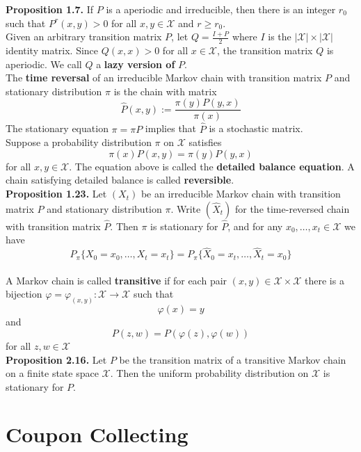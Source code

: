 \documentclass[12pt]{article}
\begin{document}
\textbf{Proposition 1.7.} If $P$ is a aperiodic and irreducible, then there is an integer $r_0$ such that $P^r(x,y) > 0$ for all $x, y \in \mathcal{X}$ and $r \geq r_0$.\\

Given an arbitrary transition matrix $P$, let $Q = \frac{I + P}{2}$ where $I$ is the $|\mathcal{X}| \times |\mathcal{X}|$ identity matrix. Since $Q(x, x) > 0$ for all $x \in \mathcal{X}$, the transition matrix $Q$ is aperiodic. We call $Q$ a \textbf{lazy version of} $P$.\\

The \textbf{time reversal} of an irreducible Markov chain with transition matrix $P$ and stationary distribution $\pi$ is the chain with matrix $$\hat{P}(x,y) := \frac{\pi(y) P(y, x)}{\pi(x)}$$ The stationary equation $\pi = \pi P$ implies that $\hat{P}$ is a stochastic matrix.\\

Suppose a probability distribution $\pi$ on $\mathcal{X}$ satisfies $$\pi(x) P(x, y) = \pi(y)P(y,x)$$ for all $x,y \in \mathcal{X}$. The equation above is called the \textbf{detailed balance equation}. A chain satisfying detailed balance is called \textbf{reversible}.\\

\textbf{Proposition 1.23.} Let $(X_t)$ be an irreducible Markov chain with transition matrix $P$ and stationary distribution $\pi$. Write $(\hat{X}_t)$ for the time-reversed chain with transition matrix $\hat{P}$. Then $\pi$ is stationary for $\hat{P}$, and for any $x_0, \ldots, x_t \in \mathcal{X}$ we have $$P_{\pi}\{X_0 = x_0, \ldots, X_t = x_t\} = P_{\pi}\{\hat{X}_0 = x_t, \ldots, \hat{X}_t = x_0\}$$\\

A Markov chain is called \textbf{transitive} if for each pair $(x,y) \in \mathcal{X} \times \mathcal{X}$ there is a bijection $\varphi = \varphi_{(x,y)}: \mathcal{X} \to \mathcal{X}$ such that $$\varphi(x) = y$$ and $$P(z,w) = P(\varphi(z), \varphi(w))$$ for all $z, w \in \mathcal{X}$\\

\textbf{Proposition 2.16.} Let $P$ be the transition matrix of a transitive Markov chain on a finite state space $\mathcal{X}$. Then the uniform probability distribution on $\mathcal{X}$ is stationary for $P$.


\section{Coupon Collecting}
\end{document}
